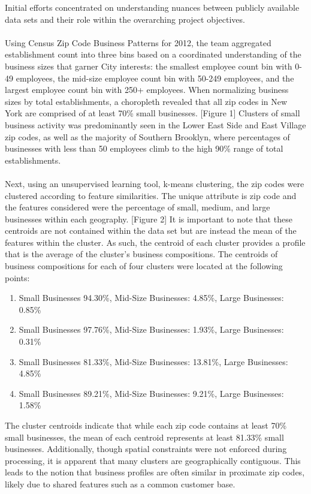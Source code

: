 \documentclass[article, 11pt]{article} %
\begin{document}
Initial efforts concentrated on understanding nuances between publicly available data sets and their role within the overarching project objectives. 
\\\\
Using Census Zip Code Business Patterns for 2012, the team aggregated establishment count into three bins based on a coordinated understanding of the business sizes that garner City interests: the smallest employee count bin with 0-49 employees, the mid-size employee count bin with 50-249 employees, and the largest employee count bin with 250+ employees. When normalizing business sizes by total establishments, a choropleth revealed that all zip codes in New York are comprised of at least 70\% small businesses. [Figure 1] Clusters of small business activity was predominantly seen in the Lower East Side and East Village zip codes, as well as the majority of Southern Brooklyn, where percentages of businesses with less than 50 employees climb to the high 90\% range of total establishments. 
\\\\
Next, using an unsupervised learning tool, k-means clustering, the zip codes were clustered according to feature similarities. The unique attribute is zip code and the features considered were the percentage of small, medium, and large businesses within each geography. [Figure 2] It is important to note that these centroids are not contained within the data set but are instead the mean of the features within the cluster. As such, the centroid of each cluster provides a profile that is the average of the cluster's business compositions. The centroids of business compositions for each of four clusters were located at the following points:
\begin{enumerate}
\item Small Businesses 94.30\%, Mid-Size Businesses: 4.85\%, Large Businesses: 0.85\%
\item Small Businesses 97.76\%, Mid-Size Businesses: 1.93\%, Large Businesses: 0.31\%
\item Small Businesses 81.33\%, Mid-Size Businesses: 13.81\%, Large Businesses: 4.85\%
\item Small Businesses 89.21\%, Mid-Size Businesses: 9.21\%, Large Businesses: 1.58\%
\end{enumerate}
The cluster centroids indicate that while each zip code contains at least 70\% small businesses, the mean of each centroid represents at least 81.33\% small businesses. Additionally, though spatial constraints were not enforced during processing, it is apparent that many clusters are geographically contiguous. This leads to the notion that business profiles are often similar in proximate zip codes, likely due to shared features such as a common customer base.
\end{document}
